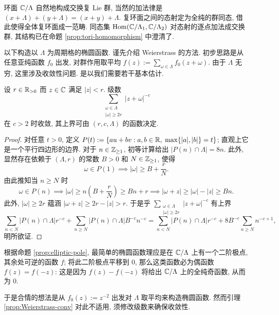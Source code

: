 环面 $\mathbb{C}/\Lambda$ 自然地构成交换复 Lie 群, 当然的加法律是 $(x + \Lambda) + (y + \Lambda) = (x+y) + \Lambda$. 复环面之间的态射定为全纯的群同态, 借此使得全体复环面成一范畴. 同态集 $\operatorname{Hom}(\mathbb{C}/\Lambda_1, \mathbb{C}/\Lambda_2)$ 对态射的逐点加法成交换群, 其结构已在命题 \ref{prop:tori-homomorphism} 中澄清了.

以下构造以 $\Lambda$ 为周期格的椭圆函数. 谨先介绍 Weierstrass 的方法. 初步思路是从任意亚纯函数 $f_0$ 出发, 对群作用取平均 $f(z) := \sum_{\omega \in \Lambda} f_0(z+\omega)$. 由于 $\Lambda$ 无穷, 这里涉及收敛性问题. 是以我们需要若干基本估计.

\begin{lemma}\label{prop:Weierstrass-conv}
	设 $r \in \mathbb{R}_{>0}$ 而 $z \in \mathbb{C}$ 满足 $|z| < r$. 级数
	\[ \sum_{\substack{\omega \in \Lambda \\ |\omega| \geq 2r }} |z + \omega|^{-c} \]
	在 $c > 2$ 时收敛, 其上界可由 $(r, c, \Lambda)$ 的函数决定.
\end{lemma}
\begin{proof}
	对任意 $t > 0$, 定义 $P(t) := \left\{ au + bv : a,b \in \mathbb{R}, \; \max\{|a|,|b|\}=t \right\}$; 直观上它是一个平行四边形的边界. 对于 $n \in \mathbb{Z}_{\geq 1}$, 初等计算给出 $|P(n) \cap \Lambda| = 8n$. 此外, 显然存在依赖于 $(\Lambda, r)$ 的常数 $B > 0$ 和 $N \in \mathbb{Z}_{\geq 1}$, 使得
	\[ \omega \in P(1) \implies |\omega| \geq B + \frac{r}{N}. \]
	由此推知当 $n \geq N$ 时
	\[ \omega \in P(n) \implies |\omega| \geq n\left(B + \frac{r}{N}\right) \geq Bn + r \implies |\omega + z| \geq |\omega| - |z| \geq Bn. \]
	此外, $|\omega| \geq 2r$ 蕴涵 $|\omega + z| \geq 2r - |z| > r$. 于是乎 $\sum_{\substack{\omega \in \Lambda \\ |\omega| \geq 2r }} |z + \omega|^{-c}$ 有上界
	\[ \sum_{n < N} |P(n) \cap \Lambda| r^{-c} + \sum_{n \geq N} |P(n) \cap \Lambda| B^{-c} n^{-c} = \sum_{n < N} |P(n) \cap \Lambda| r^{-c} + 8 B^{-c} \sum_{n \geq N} n^{-c+1}, \]
	明所欲证.
\end{proof}

根据命题 \ref{prop:elliptic-pole}, 最简单的椭圆函数理应是在 $\mathbb{C}/\Lambda$ 上有一个二阶极点, 其余处可逆的函数 $f$; 将此二阶极点平移到 $0$, 那么这类函数必为偶函数 $f(z) = f(-z)$: 这是因为 $f(z) - f(-z)$ 将给出 $\mathbb{C}/\Lambda$ 上的全纯奇函数, 从而为 $0$.

于是合情的想法是从 $f_0(z) := z^{-2}$ 出发对 $\Lambda$ 取平均来构造椭圆函数. 然而引理 \ref{prop:Weierstrass-conv} 对此不适用, 须修改级数来确保收敛性.

